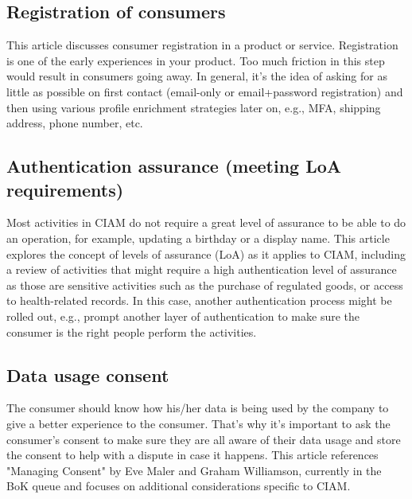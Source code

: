 \hypertarget{registration-of-consumers}{%
\subsection{Registration of
consumers}\label{registration-of-consumers}}

This article discusses consumer registration in a product or service.
Registration is one of the early experiences in your product. Too much
friction in this step would result in consumers going away. In general,
it's the idea of asking for as little as possible on first contact
(email-only or email+password registration) and then using various
profile enrichment strategies later on, e.g., MFA, shipping address,
phone number, etc.

\hypertarget{authentication-assurance-meeting-loa-requirements}{%
\subsection{Authentication assurance (meeting LoA
requirements)}\label{authentication-assurance-meeting-loa-requirements}}

Most activities in CIAM do not require a great level of assurance to be
able to do an operation, for example, updating a birthday or a display
name. This article explores the concept of levels of assurance (LoA) as
it applies to CIAM, including a review of activities that might require
a high authentication level of assurance as those are sensitive
activities such as the purchase of regulated goods, or access to
health-related records. In this case, another authentication process
might be rolled out, e.g., prompt another layer of authentication to
make sure the consumer is the right people perform the activities.~

\hypertarget{data-usage-consent}{%
\subsection{Data usage consent}\label{data-usage-consent}}

The consumer should know how his/her data is being used by the company
to give a better experience to the consumer. That's why it's important
to ask the consumer's consent to make sure they are all aware of their
data usage and store the consent to help with a dispute in case it
happens. This article references "Managing Consent" by Eve Maler and
Graham Williamson, currently in the BoK queue and focuses on additional
considerations specific to CIAM.

